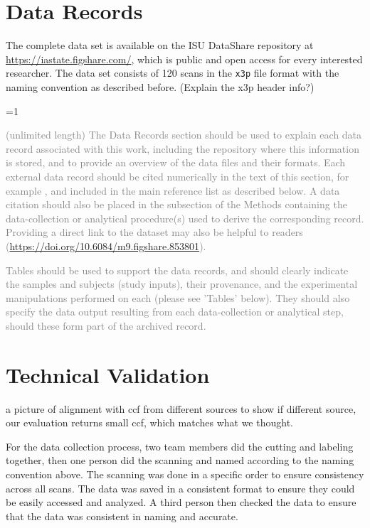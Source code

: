 \documentclass[fleqn,10pt]{wlscirep}
\newcommand{\tom}[1]{{\textcolor{RedOrange}{#1}}}
\newcommand{\ifinstruction}{0} %
\begin{document}
\section{Data Records}\label{sec-data-records}

The complete data set is available on the ISU DataShare repository at
\href{https://iastate.figshare.com/}{https://iastate.figshare.com/},
which is public and open access for every interested researcher. The
data set consists of 120 scans in the \texttt{x3p} file format with the
naming convention as described before.
\tom{(Explain the x3p header info?)}

\ifnum \ifinstruction=1

\textcolor{gray}{(unlimited length) The Data Records section should be used to explain each data record associated with this work, including the repository where this information is stored, and to provide an overview of the data files and their formats. Each external data record should be cited numerically in the text of this section, for example \cite{Hao:gidmaps:2014}, and included in the main reference list as described below. A data citation should also be placed in the subsection of the Methods containing the data-collection or analytical procedure(s) used to derive the corresponding record. Providing a direct link to the dataset may also be helpful to readers (\hyperlink{https://doi.org/10.6084/m9.figshare.853801}{https://doi.org/10.6084/m9.figshare.853801}).}

\textcolor{gray}{Tables should be used to support the data records, and should clearly indicate the samples and subjects (study inputs), their provenance, and the experimental manipulations performed on each (please see 'Tables' below). They should also specify the data output resulting from each data-collection or analytical step, should these form part of the archived record.}
\fi

\section{Technical Validation}\label{sec-technical-validation}

\tom{a picture of alignment with ccf from different sources to show if different source, our evaluation returns small ccf, which matches what we thought.}

For the data collection process, two team members did the cutting and
labeling together, then one person did the scanning and named according
to the naming convention above. The scanning was done in a specific
order to ensure consistency across all scans. The data was saved in a
consistent format to ensure they could be easily accessed and analyzed.
A third person then checked the data to ensure that the data was
consistent in naming and accurate.
\end{document}

